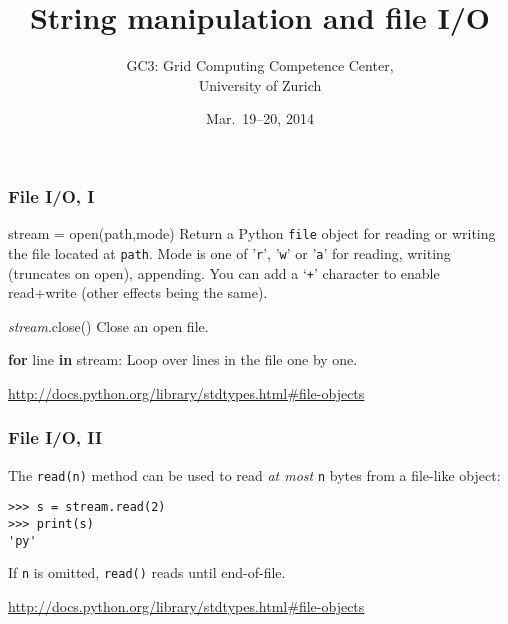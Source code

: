 \documentclass[english,serif,mathserif,xcolor=pdftex,dvipsnames,table]{beamer}
\title[Part 4]{%
  String manipulation and file I/O
}
\author[GC3]{%
  GC3: Grid Computing Competence Center, \\
  University of Zurich
}
\date{Mar.~19--20, 2014}
\begin{document}
\maketitle

\begin{frame}[fragile]
  \frametitle{File I/O, I}

  \begin{describe}{\ttfamily stream = open(path,mode)}
    Return a Python \texttt{file} object for reading or writing the
    file located at \texttt{path}.  Mode is one of '\texttt{r}',
    '\texttt{w}' or '\texttt{a}' for reading, writing (truncates on open), appending.
    You can add a `\texttt{+}' character to enable read+write (other
    effects being the same).
  \end{describe}

  \begin{describe}{\ttfamily \emph{stream}.close()}
    Close an open file.
  \end{describe}

  \begin{describe}{\ttfamily \textbf{for} line \textbf{in} stream:}
    Loop over lines in the file one by one.
  \end{describe}

  \begin{references}
    \url{http://docs.python.org/library/stdtypes.html#file-objects}
  \end{references}
\end{frame}


\begin{frame}[fragile]
  \frametitle{File I/O, II}

  The \lstinline|read(n)| method can be used to read \emph{at most}
  \lstinline|n| bytes from a file-like object:
\begin{lstlisting}
>>> s = stream.read(2)
>>> print(s)
'py'
\end{lstlisting}
  If \lstinline|n| is omitted, \texttt{read()} reads until end-of-file.

  \begin{references}
    \url{http://docs.python.org/library/stdtypes.html#file-objects}
  \end{references}
\end{frame}
\end{document}
